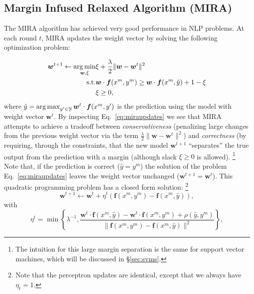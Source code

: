 \subsection{Margin Infused Relaxed Algorithm (MIRA)}

The MIRA algorithm \citep{Crammer2002,Crammer2006}  has achieved very good performance in NLP problems. 
At each round $t$, MIRA updates the weight vector by solving the following optimization problem: 

\begin{eqnarray}\label{eq:miraupdates} 
\boldsymbol{w}^{t+1} \leftarrow \operatorname*{arg\,min}_{\boldsymbol{w}, \xi} & \xi  + \frac{\lambda}{2} \|\boldsymbol{w} - \boldsymbol{w}^t\|^2 \\
\text{s.t.} & \boldsymbol{w} \cdot \boldsymbol{f}(x^m,y^m) \ge \boldsymbol{w} \cdot\boldsymbol{f}(x^m,\hat{y}) + 1 - \xi\\
& \xi \ge 0,
\end{eqnarray} 
where $\hat{y}=\operatorname*{arg\,max}_{y'\in\mathcal{Y}} \boldsymbol{w}^t \cdot \boldsymbol{f}(x^m,y')$ is the prediction using the model with weight vector 
$\boldsymbol{w}^t$. By inspecting Eq.~\ref{eq:miraupdates} we see that MIRA attempts to achieve a tradeoff between \emph{conservativeness} 
(penalizing large changes from the previous weight vector via the term $\frac{\lambda}{2} \|\boldsymbol{w} - \boldsymbol{w}^t\|^2$) 
and \emph{correctness} (by requiring, through the constraints, that the new model  $\boldsymbol{w}^{t+1}$ ``separates'' the true output 
from the prediction with a margin (although slack $\xi \ge 0$ is allowed).%
\footnote{The intuition for this large margin separation is the same for support vector machines, which will be discussed in \S\ref{sec:svms}.} %
Note that, if the prediction is correct ($\hat{y}=y^m$) the solution of the problem 
Eq.~\ref{eq:miraupdates} leaves the weight vector unchanged ($\boldsymbol{w}^{t+1}=\boldsymbol{w}^t$). 
This quadratic programming problem has a closed form solution:%
\footnote{Note that the perceptron updates are identical, except that we always have $\eta_t=1$.} %
$$\boldsymbol{w}^{t+1} \leftarrow  \boldsymbol{w}^{t} + \eta^t  (\boldsymbol{f}(x^m,y^m) - \boldsymbol{f}(x^m,\hat{y})),$$ 
with $$\eta^t = \min\left\{\lambda^{-1}, \frac{\boldsymbol{w}^t \cdot \boldsymbol{f}(x^m,\hat{y}) - 
\boldsymbol{w}^t \cdot \boldsymbol{f}(x^m,y^m) + \rho(\hat{y},y^m)}{\|\boldsymbol{f}(x^m,y^m) - \boldsymbol{f}(x^m,\hat{y})\|^2}\right\},$$
